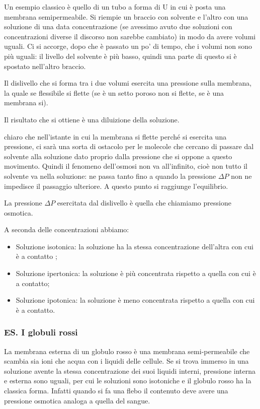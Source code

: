 Un esempio classico è quello di un tubo a forma di U in cui è posta una membrana semipermeabile. Si riempie un braccio con solvente e l'altro con una soluzione di una data concentrazione (se avessimo avuto due soluzioni con concentrazioni diverse il discorso non sarebbe cambiato) in modo da avere volumi uguali. Ci si accorge, dopo che è passato un po' di tempo, che i volumi non sono più uguali: il livello del solvente è più basso, quindi una parte di questo si è spostato nell'altro braccio.

Il dislivello che si forma tra i due volumi esercita una pressione sulla membrana, la quale se flessibile si flette (se è un setto poroso non si flette, se è una membrana si).

Il risultato che si ottiene è una diluizione della soluzione.

\E chiaro che nell'istante in cui la membrana si flette perché si esercita una pressione, ci sarà una sorta di ostacolo per le molecole che cercano di passare dal solvente alla soluzione dato proprio dalla pressione che si oppone a questo movimento. Quindi il fenomeno dell'osmosi non va all'infinito, cioè non tutto il solvente va nella soluzione: ne passa tanto fino a quando la pressione $\Delta P$ non ne impedisce il passaggio ulteriore. A questo punto si raggiunge l'equilibrio.

La pressione $\Delta P$ esercitata dal dislivello è quella che chiamiamo pressione osmotica.

A seconda delle concentrazioni abbiamo:

\begin{itemize}
    \item Soluzione isotonica: la soluzione ha la stessa concentrazione dell'altra con cui è a contatto ;
    \item Soluzione ipertonica: la soluzione è più concentrata rispetto a quella con cui è a contatto;
    \item Soluzione ipotonica: la soluzione è meno concentrata rispetto a quella con cui è a contatto.
\end{itemize}

\subsubsection{ES. I globuli rossi}
La membrana esterna di un globulo rosso è una membrana semi-permeabile che scambia sia ioni che acqua con i liquidi delle cellule. Se si trova immerso in una soluzione avente la stessa concentrazione dei suoi liquidi interni, pressione interna e esterna sono uguali, per cui le soluzioni sono isotoniche e il globulo rosso ha la classica forma. Infatti quando si fa una flebo il contenuto deve avere una pressione osmotica analoga a quella del sangue.

